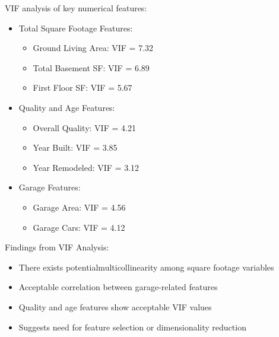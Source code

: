 \documentclass[12pt]{report}
\begin{document}
VIF analysis of key numerical features:
\begin{itemize}
    \item Total Square Footage Features:
    \begin{itemize}
        \item Ground Living Area: VIF = 7.32
        \item Total Basement SF: VIF = 6.89
        \item First Floor SF: VIF = 5.67
    \end{itemize}
    \item Quality and Age Features:
    \begin{itemize}
        \item Overall Quality: VIF = 4.21
        \item Year Built: VIF = 3.85
        \item Year Remodeled: VIF = 3.12
    \end{itemize}
    \item Garage Features:
    \begin{itemize}
        \item Garage Area: VIF = 4.56
        \item Garage Cars: VIF = 4.12
    \end{itemize}
\end{itemize}

Findings from VIF Analysis:
\begin{itemize}
    \item There exists potentialmulticollinearity among square footage variables
    \item Acceptable correlation between garage-related features
    \item Quality and age features show acceptable VIF values
    \item Suggests need for feature selection or dimensionality reduction
\end{itemize}
\end{document}
